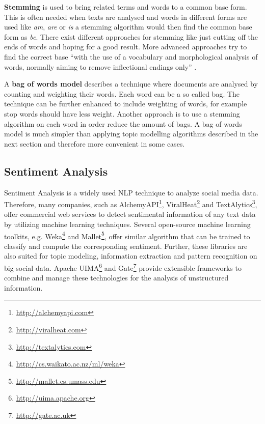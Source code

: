 \textbf{Stemming} is used to bring related terms and words to a common base form. This is often needed when texts are analysed and words in different forms are used like \textit{am}, \textit{are} or \textit{is} a stemming algorithm would then find the common base form as \textit{be}. There exist different approaches for stemming like just cutting off the ends of words and hoping for a good result. More advanced approaches try to find the correct base \enquote{with the use of a vocabulary and morphological analysis of words, normally aiming to remove inflectional endings only} \cite[32]{manning2008introduction}.

A \textbf{bag of words model} describes a technique where documents are analysed by counting and weighting their words. Each word can be a so called bag. The technique can be further enhanced to include weighting of words, for example stop words should have less weight. Another approach is to use a stemming algorithm on each word in order reduce the amount of bags. A bag of words model is much simpler than applying topic modelling algorithms described in the next section and therefore more convenient in some cases. \cite[117]{manning2008introduction}


\subsection{Sentiment Analysis}
\label{subsec:sentiment-analysis}
Sentiment Analysis is a widely used NLP technique to analyze social media data. Therefore, many companies, such as AlchemyAPI\footnote{\url{http://alchemyapi.com} \accessednote}, ViralHeat\footnote{\url{http://viralheat.com} \accessednote} and TextAlytics\footnote{\url{http://textalytics.com} \accessednote}, offer commercial web services to detect sentimental information of any text data by utilizing machine learning techniques. Several open-source machine learning toolkits, e.g. Weka\footnote{\url{http://cs.waikato.ac.nz/ml/weka} \accessednote} and Mallet\footnote{\url{http://mallet.cs.umass.edu} \accessednote}, offer similar algorithm that can be trained to classify and compute the corresponding sentiment. Further, these libraries are also suited for topic modeling, information extraction and pattern recognition on big social data. Apache UIMA\footnote{\url{http://uima.apache.org} \accessednote} and Gate\footnote{\url{http://gate.ac.uk} \accessednote} provide extensible frameworks to combine and manage these technologies for the analysis of unstructured information.


